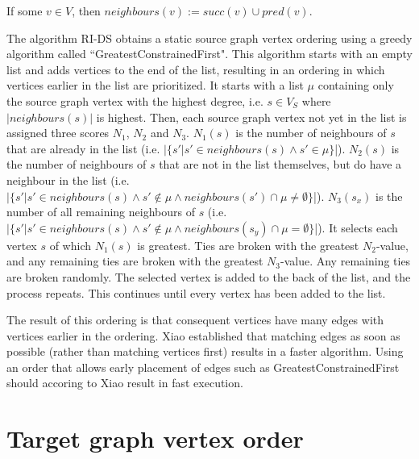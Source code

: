 \begin{defn}
If some $v\in V$, then $\mathit{neighbours}(v):= \mathit{succ}(v) \cup \mathit{pred}(v)$.
\end{defn}



The algorithm RI-DS obtains a static source graph vertex ordering using a greedy algorithm called ``GreatestConstrainedFirst". This algorithm starts with an empty list and adds vertices to the end of the list, resulting in an ordering in which vertices earlier in the list are prioritized. It starts with a list $\mu$ containing only the source graph vertex with the highest degree, i.e. $s\in V_S$ where $|\mathit{neighbours}(s)|$ is highest. Then, each source graph vertex not yet in the list is assigned three scores $N_1$, $N_2$ and $N_3$. $N_1(s)$ is the number of neighbours of $s$ that are already in the list (i.e. $|\{s' | s' \in \mathit{neighbours}(s) \land s' \in \mu\}$|). $N_2(s)$ is the number of neighbours of $s$ that are not in the list themselves, but do have a neighbour in the list (i.e. $|\{s' | s' \in \mathit{neighbours}(s) \land s' \not \in \mu \land \mathit{neighbours}(s') \cap \mu \neq \emptyset\}$|). $N_3(s_x)$ is the number of all remaining neighbours of $s$ (i.e. $|\{s' | s' \in \mathit{neighbours}(s) \land s' \not \in \mu \land \mathit{neighbours}(s_y) \cap \mu = \emptyset\}$|). It selects each vertex $s$ of which $N_1(s)$ is greatest. Ties are broken with the greatest $N_2$-value, and any remaining ties are broken with the greatest $N_3$-value. Any remaining ties are broken randomly. The selected vertex is added to the back of the list, and the process repeats. This continues until every vertex has been added to the list.

The result of this ordering is that consequent vertices have many edges with vertices earlier in the ordering. Xiao established that matching edges as soon as possible (rather than matching vertices first) results in a faster algorithm. Using an order that allows early placement of edges such as GreatestConstrainedFirst should accoring to Xiao result in fast execution.
\section{Target graph vertex order}
\label{sec:targetOrder}

